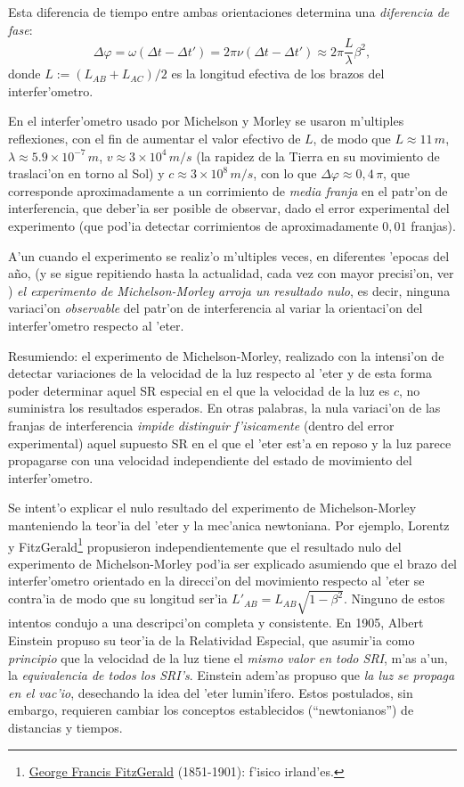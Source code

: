 Esta diferencia de tiempo entre ambas orientaciones determina una \textit{diferencia de fase}:
\begin{equation}
\Delta\varphi=\omega(\Delta t-\Delta t')=2\pi\nu(\Delta t-\Delta t')\approx2\pi\frac{L}{\lambda} \beta^2,
\end{equation}
donde $L:=(L_{AB}+L_{AC})/2$ es la longitud efectiva de los brazos del interfer'ometro.

En el interfer'ometro usado por Michelson y Morley se usaron m'ultiples reflexiones, con el fin de aumentar el valor efectivo de $L$, de modo que $L\approx 11\, m$, $\lambda\approx 5.9\times 10^{-7}\, m$, $v\approx 3\times 10^4\, m/s$ (la rapidez de la Tierra en su movimiento de traslaci'on en torno al Sol) y $c \approx 3\times 10^{8}\, m/s$, con lo que $\Delta\varphi \approx 0,4\,\pi$, que corresponde aproximadamente a un corrimiento de \textit{media franja} en el patr'on de interferencia, que deber'ia ser posible de observar, dado el error experimental del experimento (que pod'ia detectar corrimientos de aproximadamente $0,01$ franjas).

A'un cuando el experimento se realiz'o m'ultiples veces, en diferentes 'epocas del a\~no, (y se sigue repitiendo hasta la actualidad, cada vez con mayor precisi'on, ver \cite{MHBSP03}) \textit{el experimento de Michelson-Morley arroja un resultado nulo}, es decir, ninguna variaci'on \textit{observable} del patr'on de interferencia al variar la orientaci'on del interfer'ometro respecto al 'eter.

Resumiendo: el experimento de Michelson-Morley, realizado con la intensi'on de detectar variaciones de la velocidad de la luz respecto al 'eter y de esta forma poder determinar aquel SR especial en el que la velocidad de la luz es $c$, no suministra los resultados esperados. En otras palabras, la nula variaci'on de las franjas de interferencia \textit{impide distinguir f'isicamente }(dentro del error experimental) aquel supuesto SR en el que el 'eter est'a en reposo y la luz parece propagarse con una velocidad independiente del estado de movimiento del interfer'ometro.

Se intent'o explicar el nulo resultado del experimento de Michelson-Morley manteniendo la teor'ia del 'eter y la mec'anica newtoniana. Por ejemplo, Lorentz y FitzGerald\footnote{\href{{http://es.wikipedia.org/wiki/George_Francis_FitzGerald}}{George Francis FitzGerald} (1851-1901): f'isico irland'es.} propusieron independientemente que el resultado nulo del experimento de Michelson-Morley pod'ia ser explicado asumiendo que el brazo del interfer'ometro orientado en la direcci'on del movimiento respecto al 'eter se contra'ia de modo que su longitud ser'ia $L'_{AB}=L_{AB}\sqrt{1-\beta^2}$. Ninguno de estos intentos condujo a una descripci'on completa y consistente. En 1905, Albert Einstein propuso su teor'ia de la Relatividad Especial, que asumir'ia como \textit{principio} que la velocidad de la luz tiene el \textit{mismo valor en todo SRI}, m'as a'un, la \textit{equivalencia de todos los SRI's}. Einstein adem'as propuso que \textit{la luz se propaga en el vac'io}, desechando la idea del 'eter lumin'ifero. Estos postulados, sin embargo, requieren cambiar los conceptos establecidos (``newtonianos'') de distancias y tiempos.

